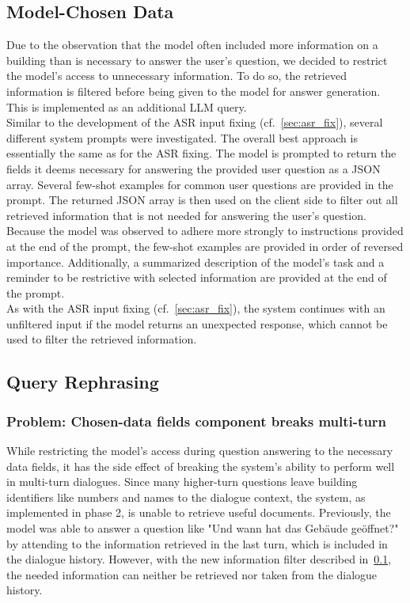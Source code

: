 \documentclass{article}
\begin{document}
\subsection{Model-Chosen Data} \label{sec:chosen_fields}
Due to the observation that the model often included more information on a building than is necessary to answer the user's question, we decided to restrict the model's access to unnecessary information. To do so, the retrieved information is filtered before being given to the model for answer generation. This is implemented as an additional LLM query.\\

Similar to the development of the ASR input fixing (cf.~\cref{sec:asr_fix}), several different system prompts were investigated. The overall best approach is essentially the same as for the ASR fixing. The model is prompted to return the fields it deems necessary for answering the provided user question as a JSON array. Several few-shot examples for common user questions are provided in the prompt. The returned JSON array is then used on the client side to filter out all retrieved information that is not needed for answering the user's question. Because the model was observed to adhere more strongly to instructions provided at the end of the prompt, the few-shot examples are provided in order of reversed importance. Additionally, a summarized description of the model's task and a reminder to be restrictive with selected information are provided at the end of the prompt.\\

As with the ASR input fixing (cf.~\cref{sec:asr_fix}), the system continues with an unfiltered input if the model returns an unexpected response, which cannot be used to filter the retrieved information.

\subsection{Query Rephrasing} \label{sec:query_rephr}

\subsubsection*{Problem: Chosen-data fields component breaks multi-turn}
While restricting the model's access during question answering to the necessary data fields, it has the side effect of breaking the system's ability to perform well in multi-turn dialogues. Since many higher-turn questions leave building identifiers like numbers and names to the dialogue context, the system, as implemented in phase 2, is unable to retrieve useful documents. Previously, the model was able to answer a question like "Und wann hat das Gebäude geöffnet?" by attending to the information retrieved in the last turn, which is included in the dialogue history. However, with the new information filter described in~\cref{sec:chosen_fields}, the needed information can neither be retrieved nor taken from the dialogue history.
\end{document}

